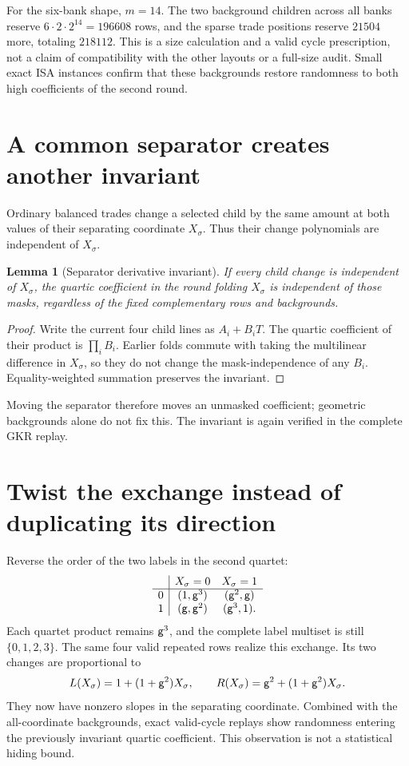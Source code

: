 \documentclass[11pt]{article}
\newtheorem{lemma}{Lemma}
\begin{document}
For the six-bank shape, $m=14$. The two background children across all banks reserve $6\cdot2\cdot2^{14}=196608$ rows, and the sparse trade positions reserve $21504$ more, totaling $218112$. This is a size calculation and a valid cycle prescription, not a claim of compatibility with the other layouts or a full-size audit. Small exact ISA instances confirm that these backgrounds restore randomness to both high coefficients of the second round.

\section{A common separator creates another invariant}

Ordinary balanced trades change a selected child by the same amount at both values of their separating coordinate $X_\sigma$. Thus their change polynomials are independent of $X_\sigma$.

\begin{lemma}[Separator derivative invariant]
If every child change is independent of $X_\sigma$, the quartic coefficient in the round folding $X_\sigma$ is independent of those masks, regardless of the fixed complementary rows and backgrounds.
\end{lemma}
\begin{proof}
Write the current four child lines as $A_i+B_iT$. The quartic coefficient of their product is $\prod_i B_i$. Earlier folds commute with taking the multilinear difference in $X_\sigma$, so they do not change the mask-independence of any $B_i$. Equality-weighted summation preserves the invariant.
\end{proof}

Moving the separator therefore moves an unmasked coefficient; geometric backgrounds alone do not fix this. The invariant is again verified in the complete GKR replay.

\section{Twist the exchange instead of duplicating its direction}

Reverse the order of the two labels in the second quartet:
\[
\begin{array}{c|cc}
 &X_\sigma=0&X_\sigma=1\\ \hline
0 &(1,\mathsf{g}^3)&(\mathsf{g}^2,\mathsf{g})\\
1 &(\mathsf{g},\mathsf{g}^2)&(\mathsf{g}^3,1).
\end{array}
\]
Each quartet product remains $\mathsf{g}^3$, and the complete label multiset is still $\{0,1,2,3\}$. The same four valid repeated rows realize this exchange. Its two changes are proportional to
\[
 L(X_\sigma)=1+(1+\mathsf{g}^2)X_\sigma,
 \qquad R(X_\sigma)=\mathsf{g}^2+(1+\mathsf{g}^2)X_\sigma.
\]
They now have nonzero slopes in the separating coordinate. Combined with the all-coordinate backgrounds, exact valid-cycle replays show randomness entering the previously invariant quartic coefficient. This observation is not a statistical hiding bound.
\end{document}

